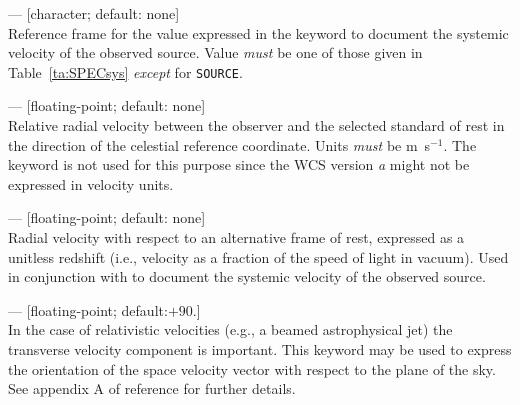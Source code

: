 \documentclass[11pt,makeidx]{book}     %
\begin{document}
\begin{description}

\item {}  --- [character; default: none]\\ Reference frame for the value
expressed in the  keyword to document the systemic velocity of the observed
source. Value \emph{must} be one of those given in Table~\ref{ta:SPECsys} \emph{except} for
\texttt{SOURCE}.

\item {}  --- [floating-point; default: none]\\ Relative radial velocity between
the observer and the selected standard of rest in the direction of the celestial reference
coordinate. Units \emph{must} be m~s$^{-1}$.  The  
keyword is not used for this purpose  since the WCS version \textit{a} might not 
be expressed in velocity units.

\item {}  --- [floating-point; default: none]\\ Radial velocity with respect to
an alternative frame of rest, expressed as a unitless redshift (i.e., velocity as a fraction
of the speed of light in vacuum). Used in conjunction with  to document the
systemic velocity of the observed source.

\item {}  --- [floating-point; default:$+90.$]\\
In the case of relativistic velocities (e.g., a beamed astrophysical jet) the transverse velocity
component is important.  This keyword may be used to express the orientation of the space 
velocity vector with respect to the plane of the sky.  See appendix A of reference \cite{greisen06}
for further details.

\end{description} 
\end{document}
